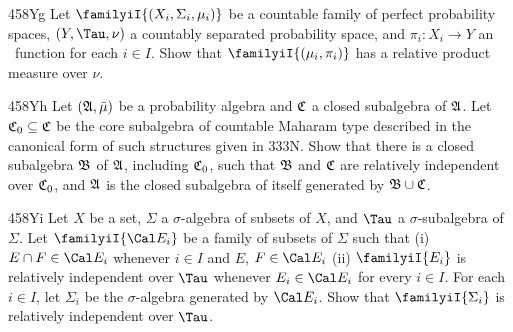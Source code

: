 {\spheader 458Yg Let $\familyiI{(X_i,\Sigma_i,\mu_i)}$ be a countable
family of perfect
probability spaces, $(Y,\Tau,\nu)$ a countably separated
probability space, and
$\pi_i:X_i\to Y$ an \imp\ function for each $i\in I$.   Show that
$\familyiI{(\mu_i,\pi_i)}$ has a relative product measure over $\nu$.

\spheader 458Yh Let $(\frak A,\bar\mu)$ be a probability algebra and
$\frak C$ a closed subalgebra of $\frak A$.   Let
$\frak C_0\subseteq\frak C$ be the core subalgebra of countable Maharam
type described in the
canonical form of such structures given in 333N.   Show that there is a
closed subalgebra $\frak B$ of $\frak A$, including $\frak C_0$, such that
$\frak B$ and $\frak C$ are relatively independent over $\frak C_0$, and
$\frak A$ is the closed subalgebra of itself generated by
$\frak B\cup\frak C$.

\spheader 458Yi Let $X$ be a set, $\Sigma$ a $\sigma$-algebra
of subsets of $X$, and $\Tau$ a $\sigma$-subalgebra of $\Sigma$.   Let
$\familyiI{\Cal E_i}$ be a family of subsets of $\Sigma$ such that (i)
$E\cap F\in\Cal E_i$ whenever $i\in I$ and $E$, $F\in\Cal E_i$ (ii)
$\familyiI{E_i}$ is relatively independent over $\Tau$ whenever
$E_i\in\Cal E_i$ for every $i\in I$.   For each $i\in I$,
let $\Sigma_i$ be the $\sigma$-algebra generated by $\Cal E_i$.   Show that
$\familyiI{\Sigma_i}$ is relatively independent over $\Tau$.

 }%

